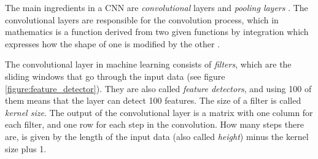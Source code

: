\noindent The main ingredients in a CNN are \textit{convolutional} layers and \textit{pooling layers} \cite{deep_learning}. The convolutional layers are responsible for the convolution process, which in mathematics is a function derived from two given functions by integration which expresses how the shape of one is modified by the other \cite{convolution_definition}. 

The convolutional layer in machine learning consists of \textit{filters}, which are the sliding windows that go through the input data (see figure \ref{figure:feature_detector}). They are also called \textit{feature detectors}, and using 100 of them means that the layer can detect 100 features. The size of a filter is called \textit{kernel size}. The output of the convolutional layer is a matrix with one column for each filter, and one row for each step in the convolution. How many steps there are, is given by the length of the input data (also called \textit{height}) minus the kernel size plus 1.

